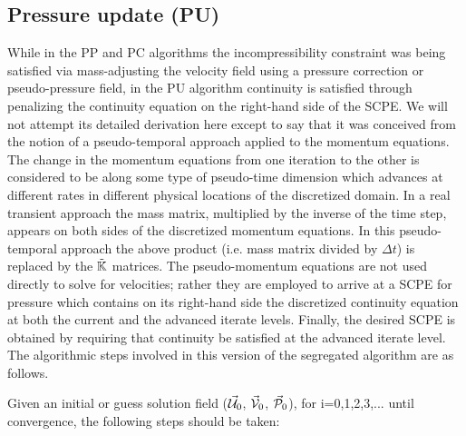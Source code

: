 \documentclass[a4paper,12pt]{article}
\begin{document}
\subsection{Pressure update (PU)}

While in the PP and PC algorithms the incompressibility constraint 
was being satisfied via mass-adjusting the velocity field using a pressure
correction or pseudo-pressure field, in the PU algorithm continuity is 
satisfied through penalizing
the continuity equation on the right-hand side of the SCPE. 
We will not attempt its detailed
derivation here except to say that it was conceived from the notion 
of a pseudo-temporal approach applied to the momentum equations. 
The change in the momentum equations from one
iteration to the other is considered to be along some type of 
pseudo-time dimension which
advances at different rates in different physical locations of 
the discretized domain. In a real transient approach the mass matrix, 
multiplied by the inverse of the time step, appears on both
sides of the discretized momentum equations. In this pseudo-temporal 
approach the above product (i.e. mass matrix divided by $\Delta t$) is 
replaced by the $\tilde{{\mathbb{K}}}$ matrices. The pseudo-momentum
equations are not used directly to solve for velocities; rather they are 
employed to arrive at
a SCPE for pressure which contains on its right-hand side the 
discretized continuity equation at
both the current and the advanced iterate levels. Finally, the desired 
SCPE is obtained by
requiring that continuity be satisfied at the advanced iterate level.
The algorithmic steps involved in this version of the segregated 
algorithm are as follows.

Given an initial or guess solution field 
($\vec{\cal U}_0$, $\vec{\cal V}_0$, $\vec{\cal P}_0$), 
for i=0,1,2,3,... until convergence, the following steps should be taken:
\end{document}
